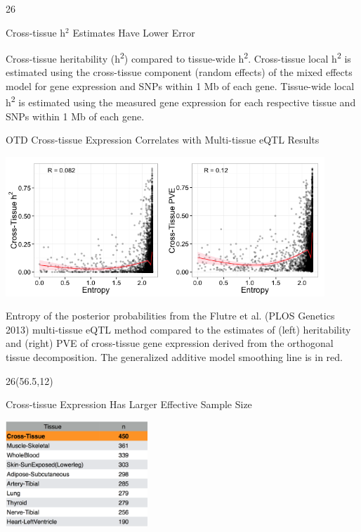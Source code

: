 \documentclass[final]{beamer}
\newcommand{\VcoordTop}{12}
\newcommand{\HcoordThird}{56.5}
\newcommand{\ColWidth}{26}
\begin{document}
\begin{frame}{}
\begin{textblock}{\ColWidth}
\begin{block}{Cross-tissue h$^2$ Estimates Have Lower Error}
\begin{center}
	\end{center}
	{\tiny Cross-tissue heritability (h\textsuperscript{2}) compared to
tissue-wide h\textsuperscript{2}. Cross-tissue local
h\textsuperscript{2} is estimated using the cross-tissue component
(random effects) of the mixed effects model for gene expression and SNPs
within 1 Mb of each gene. Tissue-wide local h\textsuperscript{2} is
estimated using the measured gene expression for each respective tissue
and SNPs within 1 Mb of each gene.\\}

\end{block}

\begin{block}{OTD Cross-tissue Expression Correlates with Multi-tissue eQTL Results}
	\begin{center}
		\includegraphics[width=0.9\textwidth]{plots/Fig-CT-entropy.png}
	\end{center}
	{\tiny Entropy of the posterior probabilities from the Flutre et al. (PLOS Genetics 2013) multi-tissue eQTL method compared to the estimates of (left) heritability and (right) PVE of cross-tissue gene expression derived from the orthogonal tissue decomposition. The generalized additive model smoothing line is in red.\\}

\end{block}

\end{textblock}


\begin{textblock}{\ColWidth}(\HcoordThird,\VcoordTop)

\begin{block}{Cross-tissue Expression Has Larger Effective Sample Size}
	\begin{center}
		\includegraphics[width=0.4\textwidth]{plots/OTD-sample-increase.png}
	\end{center}
\end{block}



\end{textblock}
\end{frame}
\end{document}
